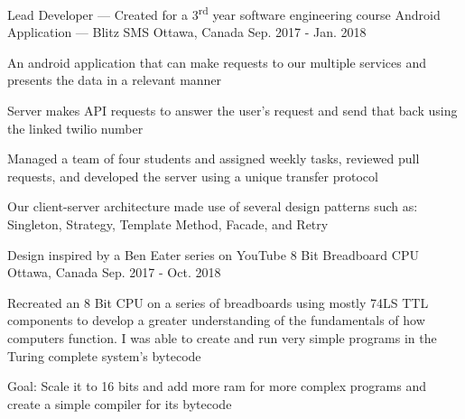 
\begin{cventries}
	\cventry
		{Lead Developer --- Created for a 3\textsuperscript{rd} year software engineering course}
		{Android Application --- Blitz SMS}
		{Ottawa, Canada}
		{Sep. 2017 - Jan. 2018}
		{\begin{cvitems}
			\item An android application that can make requests to our multiple services and presents the data in a relevant manner
			\item Server makes API requests to answer the user's request and send that back using the linked twilio number
			\item Managed a team of four students and assigned weekly tasks, reviewed pull requests, and developed the server using a unique transfer protocol
			\item Our client-server architecture made use of several design patterns such as: Singleton, Strategy, Template Method, Facade, and Retry
		\end{cvitems}}

	\cventry
		{Design inspired by a Ben Eater series on YouTube}
		{8 Bit Breadboard CPU}
		{Ottawa, Canada}
		{Sep. 2017 - Oct. 2018}
		{\begin{cvitems}
			\item Recreated an 8 Bit CPU on a series of breadboards using mostly 74LS TTL components to develop a greater understanding of the fundamentals of how computers function. I was able to create and run very simple programs in the Turing complete system's bytecode
			\item Goal: Scale it to 16 bits and add more ram for more complex programs and create a simple compiler for its bytecode
		\end{cvitems}}
\end{cventries}